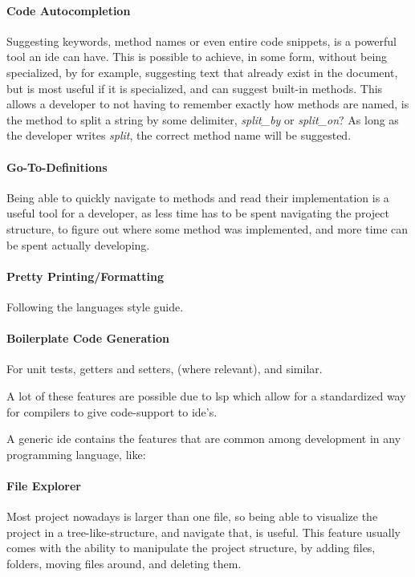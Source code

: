\paragraph{Code Autocompletion} Suggesting keywords, method names or even entire
code snippets, is a powerful tool an \gls{ide} can have. This is possible to
achieve, in some form, without being specialized, by for example, suggesting
text that already exist in the document, but is most useful if it is
specialized, and can suggest built-in methods. This allows a developer to not
having to remember exactly how methods are named, is the method to split a
string by some delimiter, \textit{split\_by} or \textit{split\_on}? As long as
the developer writes \textit{split}, the correct method name will be suggested.

\paragraph{Go-To-Definitions} Being able to quickly navigate to methods and read
their implementation is a useful tool for a developer, as less time has to be
spent navigating the project structure, to figure out where some method was
implemented, and more time can be spent actually developing.

\paragraph{Pretty Printing/Formatting} Following the languages style guide.

\paragraph{Boilerplate Code Generation} For unit tests, getters and setters,
(where relevant), and similar.

A lot of these features are possible due to \gls{lsp} which allow for a
standardized way for compilers to give code-support to \gls{ide}'s.

A generic \gls{ide} contains the features that are common among development in
any programming language, like:

\paragraph{File Explorer} Most project nowadays is larger than one file, so
being able to visualize the project in a tree-like-structure, and navigate that,
is useful. This feature usually comes with the ability to manipulate the project
structure, by adding files, folders, moving files around, and deleting them.

